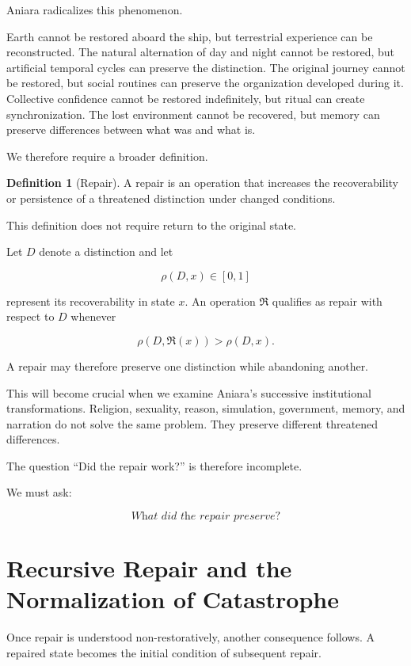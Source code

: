 \documentclass[11pt,oneside]{book}
\theoremstyle{definition}
\newtheorem{definition}[theorem]{Definition}
\theoremstyle{remark}
\newcommand{\Repair}{\mathfrak{R}}
\begin{document}
Aniara radicalizes this phenomenon.

Earth cannot be restored aboard the ship, but terrestrial experience can be reconstructed. The natural alternation of day and night cannot be restored, but artificial temporal cycles can preserve the distinction. The original journey cannot be restored, but social routines can preserve the organization developed during it. Collective confidence cannot be restored indefinitely, but ritual can create synchronization. The lost environment cannot be recovered, but memory can preserve differences between what was and what is.

We therefore require a broader definition.

\begin{definition}[Repair]
A repair is an operation that increases the recoverability or persistence of a threatened distinction under changed conditions.
\end{definition}

This definition does not require return to the original state.

Let \(D\) denote a distinction and let

\[
\rho(D,x)\in[0,1]
\]

represent its recoverability in state \(x\). An operation \(\Repair\) qualifies as repair with respect to \(D\) whenever

\[
\rho(D,\Repair(x))
>
\rho(D,x).
\]

A repair may therefore preserve one distinction while abandoning another.

This will become crucial when we examine Aniara's successive institutional transformations. Religion, sexuality, reason, simulation, government, memory, and narration do not solve the same problem. They preserve different threatened differences.

The question ``Did the repair work?'' is therefore incomplete.

We must ask:

\[
\textit{What did the repair preserve?}
\]

\section{Recursive Repair and the Normalization of Catastrophe}

Once repair is understood non-restoratively, another consequence follows. A repaired state becomes the initial condition of subsequent repair.
\end{document}
